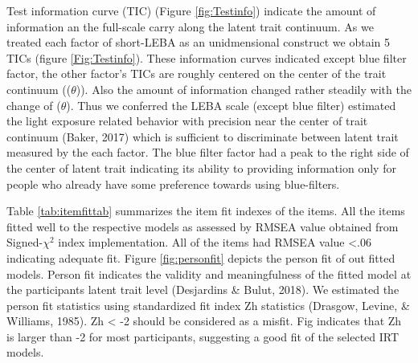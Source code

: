 \documentclass[
  english,
  man]{apa6}
\begin{document}
Test information curve (TIC) (Figure \ref{fig:Testinfo}) indicate the amount of information an the full-scale carry along the latent trait continuum. As we treated each factor of short-LEBA as an unidmensional construct we obtain 5 TICs (figure \ref{Fig:Testinfo}). These information curves indicated except blue filter factor, the other factor's TICs are roughly centered on the center of the trait continuum ((\(\theta\))). Also the amount of information changed rather steadily with the change of (\(\theta\)). Thus we conferred the LEBA scale (except blue filter) estimated the light exposure related behavior with precision near the center of trait continuum (Baker, 2017) which is sufficient to discriminate between latent trait measured by the each factor. The blue filter factor had a peak to the right side of the center of latent trait indicating its ability to providing information only for people who already have some preference towards using blue-filters.

Table \ref{tab:itemfittab} summarizes the item fit indexes of the items. All the items fitted well to the respective models as assessed by RMSEA value obtained from Signed-\(\chi^2\) index implementation. All of the items had RMSEA value \textless.06 indicating adequate fit. Figure \ref{fig:personfit} depicts the person fit of out fitted models. Person fit indicates the validity and meaningfulness of the fitted model at the participants latent trait level (Desjardins \& Bulut, 2018). We estimated the person fit statistics using standardized fit index Zh statistics (Drasgow, Levine, \& Williams, 1985). Zh \textless{} -2 should be considered as a misfit. Fig indicates that Zh is larger than -2 for most participants, suggesting a good fit of the selected IRT models.
\end{document}
